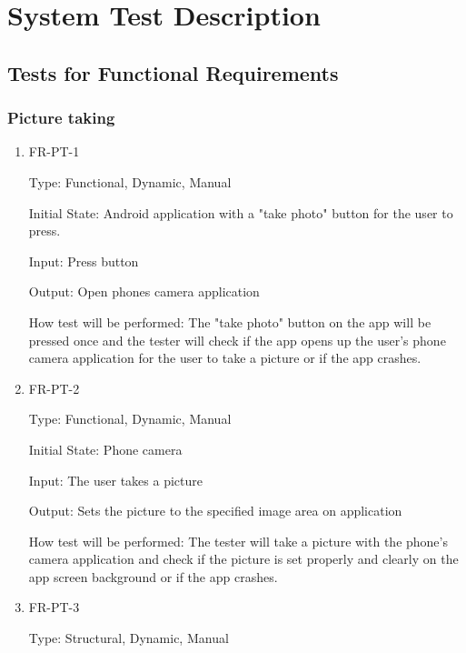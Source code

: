 \documentclass[12pt, titlepage]{article}
\begin{document}
\section{System Test Description}
	
\subsection{Tests for Functional Requirements}

\subsubsection{Picture taking}
		

\begin{enumerate}

\item{FR-PT-1\\}

	                Type: Functional, Dynamic, Manual
	
					Initial State: Android application with a "take photo" button for the user to press.
					
					Input: Press button
					
					Output: Open phones camera application
					
					How test will be performed: The "take photo" button on the app will be pressed once and the tester will check if the app opens up the user's phone camera application for the user to take a picture or if the app crashes.
	
						
					\item{FR-PT-2\\}
					
					Type: Functional, Dynamic, Manual
					
					Initial State: Phone camera 
					
					Input: The user takes a picture
					
					Output: Sets the picture to the specified image area on application
					
					How test will be performed: The tester will take a picture with the phone's camera application and check if the picture is set properly and clearly on the app screen background or if the app crashes. 
					
					\item{FR-PT-3\\}
					
					Type: Structural, Dynamic, Manual


\end{enumerate}
\end{document}
